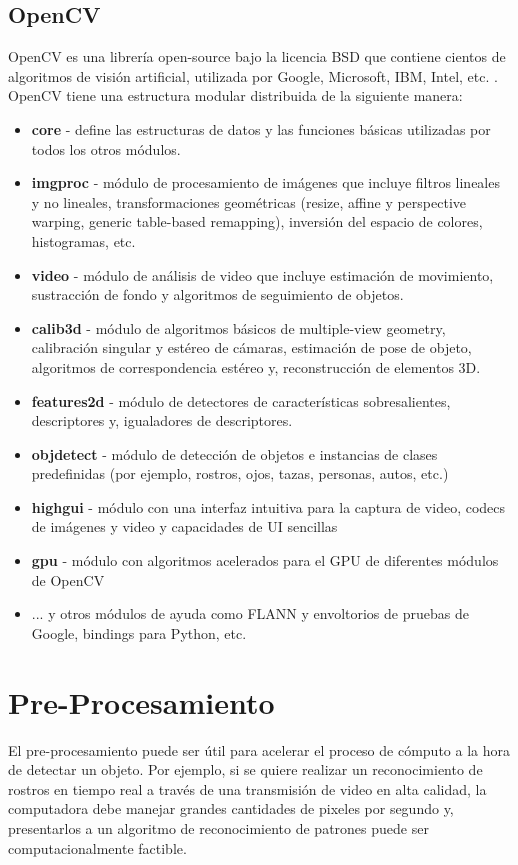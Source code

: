 \subsection{OpenCV}
OpenCV es una librería open-source bajo la licencia BSD que contiene cientos de algoritmos de visión artificial, utilizada por Google, Microsoft, IBM, Intel, etc. \parencite{OpenCV2016-bv}. OpenCV tiene una estructura modular distribuida de la siguiente manera:
\begin{itemize}
\item \textbf{core} - define las estructuras de datos y las funciones básicas utilizadas por todos los otros módulos.
\item \textbf{imgproc} - módulo de procesamiento de imágenes que incluye filtros lineales y no lineales, transformaciones geométricas (resize, affine y perspective warping, generic table-based remapping), inversión del espacio de colores, histogramas, etc.
\item \textbf{video} - módulo de análisis de video que incluye estimación de movimiento, sustracción de fondo y algoritmos de seguimiento de objetos.
\item \textbf{calib3d} - módulo de algoritmos básicos de multiple-view geometry, calibración singular y estéreo de cámaras, estimación de pose de objeto, algoritmos de correspondencia estéreo y, reconstrucción de elementos 3D.
\item \textbf{features2d} - módulo de detectores de características sobresalientes, descriptores y, igualadores de descriptores.
\item \textbf{objdetect} - módulo de detección de objetos e instancias de clases predefinidas (por ejemplo, rostros, ojos, tazas, personas, autos, etc.)
\item \textbf{highgui} - módulo con una interfaz intuitiva para la captura de video, codecs de imágenes y video y capacidades de UI sencillas
\item \textbf{gpu} - módulo con algoritmos acelerados para el GPU de diferentes módulos de OpenCV
\item ... y otros módulos de ayuda como FLANN y envoltorios de pruebas de Google, bindings para Python, etc.    
\end{itemize}


\section{Pre-Procesamiento}
El pre-procesamiento puede ser útil para acelerar el proceso de cómputo a la hora de detectar un objeto. Por ejemplo, si se quiere realizar un reconocimiento de rostros en tiempo real a través de una transmisión de video en alta calidad, la computadora debe manejar grandes cantidades de pixeles por segundo y, presentarlos a un algoritmo de reconocimiento de patrones puede ser computacionalmente factible. 

